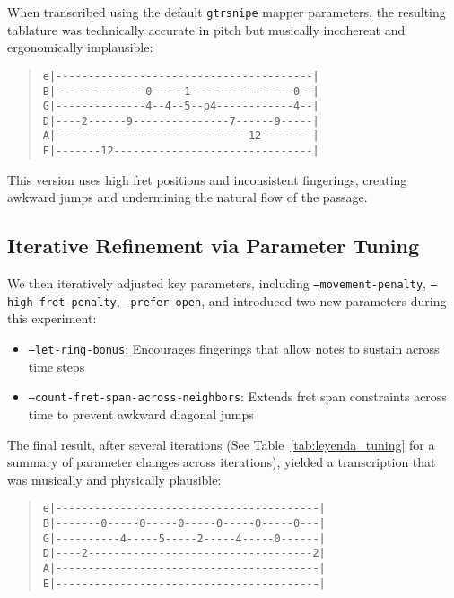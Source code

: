 \documentclass[conference]{IEEEtran}
\begin{document}
When transcribed using the default \texttt{gtrsnipe} mapper parameters, the resulting tablature was technically accurate in pitch but musically incoherent and ergonomically implausible:

\begin{quote}\small
\begin{verbatim}
e|----------------------------------------|
B|--------------0-----1----------------0--|
G|--------------4--4--5--p4------------4--|
D|----2------9---------------7------9-----|
A|------------------------------12--------|
E|-------12-------------------------------|
\end{verbatim}
\end{quote}

This version uses high fret positions and inconsistent fingerings, creating awkward jumps and undermining the natural flow of the passage.

\subsection{Iterative Refinement via Parameter Tuning}

We then iteratively adjusted key parameters, including \texttt{--movement-penalty}, \texttt{--high-fret-penalty}, \texttt{--prefer-open}, and introduced two new parameters during this experiment:

\begin{itemize}
  \item \texttt{--let-ring-bonus}: Encourages fingerings that allow notes to sustain across time steps
  \item \texttt{--count-fret-span-across-neighbors}: Extends fret span constraints across time to prevent awkward diagonal jumps
\end{itemize}

The final result, after several iterations (See Table~\ref{tab:leyenda_tuning} for a summary of parameter changes across iterations), yielded a transcription that was musically and physically plausible:


\begin{quote}\small
\begin{verbatim}
e|-----------------------------------------|
B|-------0-----0-----0-----0-----0-----0---|
G|----------4-----5-----2-----4-----0------|
D|----2-----------------------------------2|
A|-----------------------------------------|
E|-----------------------------------------|
\end{verbatim}
\end{quote}
\end{document}
